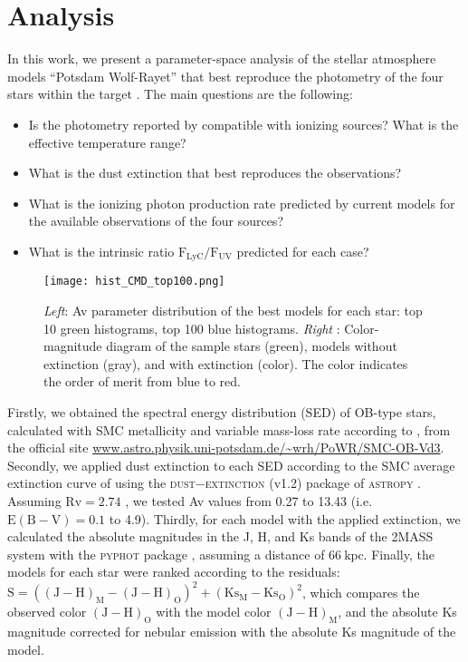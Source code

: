 \documentclass[baaa]{baaa}
\begin{document}
\section{Analysis}\label{sec:guia}

In this work, we present a parameter-space analysis of the stellar atmosphere models ``Potsdam Wolf-Rayet'' \citep[PoWR,][]{PoWR} 
that best reproduce the photometry of the four stars within the target \citep[namely stars 37, 41, 42, and 47 from][]{testor2010}.
The main questions are the following:
\begin{itemize}
 \item Is the photometry reported by \citet{testor2010} compatible with ionizing sources? What is the effective temperature range?
 \item What is the dust extinction that best reproduces the observations?
 \item What is the ionizing photon production rate predicted by current models for the available observations of the four sources?
 \item What is the intrinsic ratio  
$\mathrm{F_{LyC}/F_{UV}}$ predicted for each case?
\end{itemize}

\begin{figure}
    \centering
    \texttt{[image: hist\_CMD\_top100.png]}
    \caption{ \textit{Left}: Av parameter distribution of the best models for each star: top 10 green histograms, top 100 blue histograms.
    \textit{Right} : Color-magnitude diagram of the sample stars (green), models without extinction (gray), and with extinction (color). The color indicates the order of merit from blue to red.}
    \label{histogramas}
\end{figure}

Firstly, we obtained the spectral energy distribution (SED) of OB-type stars, calculated with SMC metallicity and variable mass-loss rate according to \citet{vink}, from the official site \url{www.astro.physik.uni-potsdam.de/~wrh/PoWR/SMC-OB-Vd3}.
Secondly, we applied dust extinction to each SED according to the SMC average extinction curve of \citet{gordon2003}
using the \textsc{dust${-}$extinction} (v1.2) package of \textsc{astropy} \citep{astropy}.
Assuming $\mathrm{Rv} = 2.74$  \citep[the average Rv for the SMC bar from ][]{gordon2003}, we tested Av values from 0.27 to 13.43 (i.e. $\mathrm{E(B-V)} = 0.1$ to 4.9).
Thirdly, for each model with the applied extinction, we calculated the absolute magnitudes in the J, H, and Ks bands of the 2MASS system  with the \textsc{pyphot} package \citep{fouesneau2022},
assuming a distance of $66 ~\mathrm{k pc}$.
Finally, the models for each star
were ranked according to the residuals: $\mathrm{S = ((J-H)_M-(J-H)_O)^2+(Ks_M-Ks_{O})^2}$, which compares the observed color $\mathrm{(J-H)_O}$ \citep[Table 3 of ][]{testor2010} with the model
color $\mathrm{(J-H)_M}$, and the absolute Ks magnitude corrected for nebular emission \citep[Ks$_{PSF}$, Table 4 of ][]{testor2010}
with the absolute Ks magnitude of the model.
\end{document}
